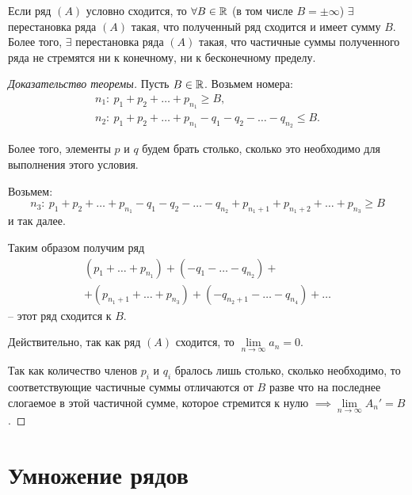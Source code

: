 \newpage

\begin{theorem}
    Если ряд $(A)$ условно сходится, то $\forall B \in \mathbb{R}$ (в том числе $B = \pm\infty$) $\exists$ перестановка ряда $(A)$ такая, что полученный ряд сходится и имеет сумму $B$. Более того, $\exists$ перестановка ряда $(A)$ такая, что частичные суммы полученного ряда не стремятся ни к конечному, ни к бесконечному пределу.
\end{theorem}

\begin{proof}[Доказательство теоремы]
    Пусть $B \in \mathbb{R}$. Возьмем номера:
    \[
        \begin{array}{l}
            n_1: \ p_1 + p_2 + \ldots + p_{n_1} \geqslant B, \\
            n_2: \ p_1 + p_2 + \ldots + p_{n_1} - q_1 - q_2 - \ldots - q_{n_2} \leqslant B.
        \end{array}
    \]

    Более того, элементы $p$ и $q$ будем брать столько, сколько это необходимо для выполнения этого условия.

    Возьмем:
    \[
        n_3: \ p_1 + p_2 + \ldots + p_{n_1} - q_1 - q_2 - \ldots - q_{n_2} + p_{n_1 + 1} + p_{n_1 + 2} + \ldots + p_{n_3} \geqslant B
    \] и так далее.

    Таким образом получим ряд
    \begin{multline*}
        (p_1 + \ldots + p_{n_1}) + (-q_1 - \ldots - q_{n_2}) + \\
        + (p_{n_1 + 1} + \ldots + p_{n_3}) + (-q_{n_2 + 1} - \ldots - q_{n_4}) + \ldots
    \end{multline*} -- этот ряд сходится к $B$.

    Действительно, так как ряд $(A)$ сходится, то $\underset{n\rightarrow\infty}{\lim} a_n = 0$.

    Так как количество членов $p_i$ и $q_i$ бралось лишь столько, сколько необходимо, то соответствующие частичные суммы отличаются от $B$ разве что на последнее слогаемое в этой частичной сумме, которое стремится к нулю $\implies \underset{n\rightarrow\infty}{\lim}A_n' = B$.
\end{proof}

\section{Умножение рядов}

